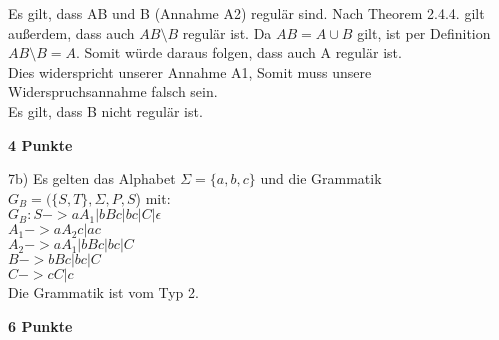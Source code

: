 \documentclass[twoside,10pt,fleqn,headinclude=false]{scrartcl}
\begin{document}
\begin{compactenum}
\begin{center}
    \end{center}
    Es gilt, dass AB und B (Annahme A2) regulär sind. Nach Theorem 2.4.4. gilt außerdem, dass auch $AB\setminus B$ regulär ist. Da $AB = A \cup B$ gilt, ist per Definition  $AB\setminus B = A$. Somit würde daraus folgen, dass auch A regulär ist. \\
    Dies widerspricht unserer Annahme A1, Somit muss unsere Widerspruchsannahme falsch sein. \\
    Es gilt, dass B nicht regulär ist. 
	\item[] \hfill \textbf{4 Punkte}
	\item[7b)] Es gelten das Alphabet $\Sigma = \{a,b,c\}$ und die Grammatik $G_B = (\{S,T\},\Sigma,P,S$) mit: \\
	$G_B : S -> aA_1 | bBc | bc | C | \epsilon$ \\
	$A_1 -> aA_2c |ac $\\
	$A_2 -> aA_1 | bBc | bc | C$ \\
	$B -> bBc | bc | C$ \\
	$C -> cC | c$ \\
	Die Grammatik ist vom Typ 2. 
	\item[] \hfill \textbf{6 Punkte}

\end{compactenum}
\end{document}
